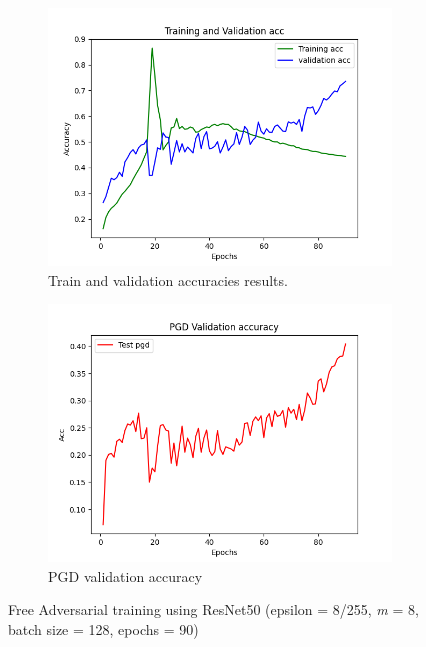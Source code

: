 \documentclass{article}
\begin{document}
\begin{figure}[hbt!]
  \centering
  \begin{subfigure}[b]{0.4\linewidth}
    \includegraphics[width=\linewidth]{images/FreeResnet/Figure_2.png}
    \caption{ Train and validation accuracies results.}
  \end{subfigure}
  \begin{subfigure}[b]{0.4\linewidth}
    \includegraphics[width=\linewidth]{images/FreeResnet/Figure_5.png}
    \caption{PGD validation accuracy}
  \end{subfigure}
  \caption{Free Adversarial training using ResNet50 (epsilon = 8/255, \textit{m} = 8, batch size = 128,  epochs = 90)}
  \label{fig:coffee}
\end{figure}
\end{document}
